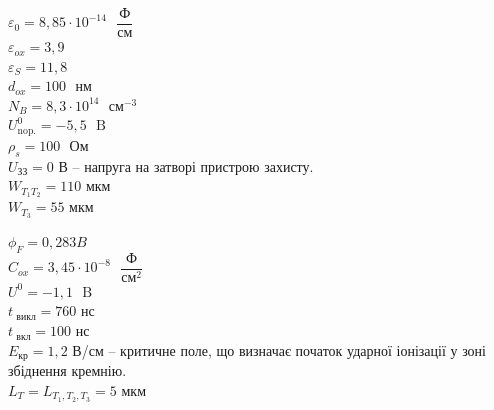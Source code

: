 \documentclass[a4paper,14pt]{extreport}
\begin{document}
	\begin{minipage}{0.5\textwidth}
	\begin{flushleft}

	$\varepsilon_{0}=8,85 \cdot 10^{-14} \text{ }\dfrac{\text{Ф}}{\text{см}}$\\
	\vspace{0.2cm}
	$\varepsilon_{ox}=3,9$\\
	\vspace{0.2cm}
	$\varepsilon_{S}=11,8$\\
	\vspace{0.2cm}
	$ d_{o x}=100 \text{ } \text{нм}$\\
	\vspace{0.2cm}
	$ N_{B}=8,3 \cdot 10^{14}\text{ } \text{см}^{-3}$\\
	\vspace{0.2cm}
	$ U_{\text{nop.}}^{0}=-5,5 \text{ }\text{B}$\\
	\vspace{0.2cm}
	$ \rho_{s}=100 \text{ }\text{Ом}$\\
	\vspace{0.2 cm}
	$U_{\text{ЗЗ}} = 0 $ В -- напруга на затворі пристрою захисту.\\
	\vspace{0.2 cm}
	$W_{T_1 T_2} = 110 $ мкм\\
	\vspace{0.2 cm}
	$W_{T_3} = 55 $ мкм\\ 


	\end{flushleft}
	\end{minipage}
	\begin{minipage}{0.4\textwidth}
	\begin{flushright}

	$\phi_{F}=0,283 B$\\
	\vspace{0.2cm}
	$C_{ox}=3,45 \cdot 10^{-8} \text{ }\dfrac{\text{Ф}}{\text{см}^{2}}$\\
	\vspace{0.2cm}
	$U^{0}=-1,1 \text{ }\text{B}$\\
	\vspace{0.2 cm}
	$ t_{\text{ викл}} = 760 \text{ нс} $\\
	\vspace{0.2 cm}
	$ t_{\text{ вкл}} = 100 \text{ нс} $\\
	\vspace{0.2 cm}
	$E_{\text{кр}} = 1,2 $ В/см --  критичне поле, що визначає початок ударної іонізації у зоні збіднення кремнію.\\
	\vspace{0.2 cm}
	$L_T=L_{T_1,T_2, T_3} = 5 $ мкм\\ 

	\end{flushright}
	\end{minipage}
\end{document}
